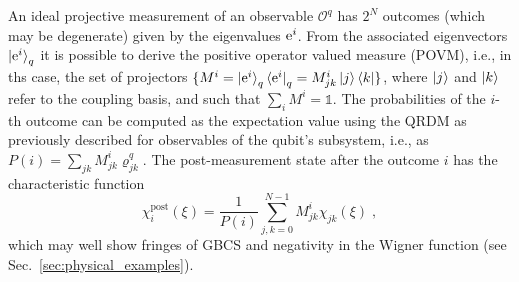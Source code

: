 \documentclass[%
reprint,
superscriptaddress,
nofootinbib,
 amsmath,amssymb,
prx,
floatfix,
]{revtex4-2}
\begin{document}
An ideal projective measurement of an observable $\mathcal{O}^q$ has $2^N$ outcomes (which may be degenerate) given by the eigenvalues ${\rm e}^i$. From the associated eigenvectors $\ket{{\rm e}^i}_q$ it is possible to derive the positive operator valued measure (POVM), i.e., in ths case, the set of projectors $\{M^i =\ket{{\rm e}^i}_q \bra{{\rm e}^i}_q= M^i_{jk} \ket{j}\bra{k} \}$, where $\ket{j}$ and $\ket{k}$ refer to the coupling basis, and such that $\sum_i M^i = \mathds{1}$. The probabilities of the $i$-th  outcome can be computed as the expectation value using the QRDM as previously described for observables of the qubit's subsystem, i.e., as $P(i) = \sum_{jk} M^i_{jk} \varrho_{jk}^q$. The post-measurement state after the outcome $i$ has the characteristic function 
\begin{equation}
    \chi^{\text{post}}_i (\xi) = \frac{1}{P(i)} \sum_{j, k  = 0}^{N-1}  M^{i}_{jk} \chi_{jk} (\xi) \;,
\end{equation}
 which may well show fringes of GBCS and negativity in the Wigner function (see Sec.~\ref{sec:physical_examples}). 
\end{document}
